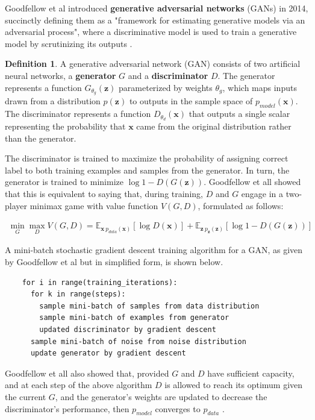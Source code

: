 \documentclass[12pt, titlepage]{report}
\theoremstyle{definition}
\newtheorem{definition}{Definition}
\begin{document}
Goodfellow et al introduced \textbf{generative adversarial networks} (GANs) in 2014, succinctly defining them as a "framework for estimating generative models via an adversarial process", where a discriminative model is used to train a generative model by scrutinizing its outputs \cite{goodfellow2014generative}.

\begin{definition}
A generative adversarial network (GAN) consists of two artificial neural networks, a \textbf{generator} $G$ and a \textbf{discriminator} $D$. The generator represents a function $G_{\theta_{g}}(\bm{z})$ parameterized by weights $\theta_g$, which maps inputs drawn from a distribution $p(\bm{z})$ to outputs in the sample space of $p_{model}(\bm{x})$. The discriminator represents a function $D_{\theta_d}(\bm{x})$ that outputs a single scalar representing the probability that $\bm{x}$ came from the original distribution rather than the generator.

The discriminator is trained to maximize the probability of assigning correct label to both training examples and samples from the generator. In turn, the generator is trained to minimize $\log{1 - D(G(\bm{z}))}$. Goodfellow et all \cite[p. 3]{goodfellow2014generative} showed that this is equivalent to saying that, during training, $D$ and $G$ engage in a two-player minimax game with value function $V(G, D)$, formulated as follows:

\begin{gather}\label{eq:gan_train}
\min_G{\max_D{V(G, D)}} = \mathbb{E}_{\bm{x}~p_{data}(\bm{x})}[\log{D(\bm{x})}] + \mathbb{E}_{\bm{z}~p_{\bm{z}}(\bm{z})}[\log{1 - D(G(\bm{z}))}]
\end{gather}
\end{definition}

A mini-batch stochastic gradient descent training algorithm for a GAN, as given by Goodfellow et al but in simplified form, is shown below.


\begin{verbatim}
    for i in range(training_iterations):
      for k in range(steps):
        sample mini-batch of samples from data distribution
        sample mini-batch of examples from generator
        updated discriminator by gradient descent
      sample mini-batch of noise from noise distribution
      update generator by gradient descent
\end{verbatim}

Goodfellow et all also showed that, provided $G$ and $D$ have sufficient capacity, and at each step of the above algorithm $D$ is allowed to reach its optimum given the current $G$, and the generator's weights are updated to decrease the discriminator's performance, then $p_{model}$ converges to $p_{data}$ \cite[p. 5]{goodfellow2014generative}.
\end{document}
